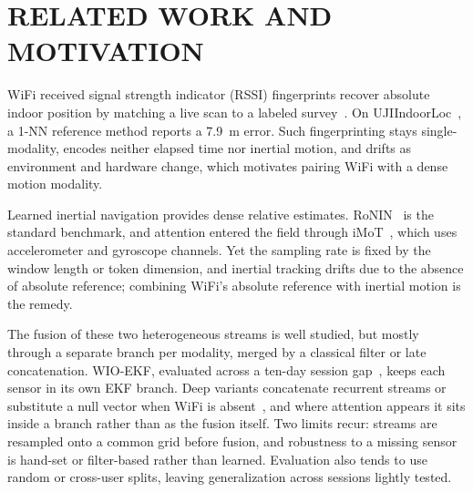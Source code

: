 \section{\uppercase{Related Work and Motivation}}\label{sec:related}

\noindent WiFi received signal strength indicator (RSSI) fingerprints recover absolute
indoor position by matching a live scan to a labeled survey~\cite{bahl2000radar}.
On UJIIndoorLoc~\cite{torressospedra2014ujiindoorloc}, a 1-NN reference method
reports a 7.9~m error. Such fingerprinting stays single-modality, encodes neither
elapsed time nor inertial motion, and drifts as environment and hardware change,
which motivates pairing WiFi with a dense motion modality.

Learned inertial navigation provides dense relative estimates.
RoNIN~\cite{yan2019ronin} is the standard benchmark, and attention entered the
field through iMoT~\cite{nguyen2025imot}, which uses accelerometer and gyroscope
channels. Yet the sampling rate is fixed by the window length or token dimension,
and inertial tracking drifts due to the absence of absolute reference; combining WiFi's
absolute reference with inertial motion is the remedy.

The fusion of these two heterogeneous streams is well studied, but mostly through
a separate branch per modality, merged by a classical filter or late
concatenation. WIO-EKF, evaluated across a ten-day session
gap~\cite{zhou2024wioekf}, keeps each sensor in its own EKF branch. Deep variants
concatenate recurrent streams or substitute a null vector when WiFi is
absent~\cite{wei2021sensorfusion}, and where attention appears it sits inside a
branch rather than as the fusion itself. Two limits recur: streams are resampled
onto a common grid before fusion, and robustness to a missing sensor is hand-set
or filter-based rather than learned. Evaluation also tends to use random or
cross-user splits, leaving generalization across sessions lightly tested.

